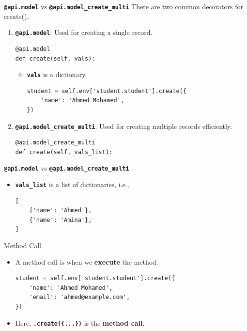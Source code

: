 \begin{frame}[fragile]{\textbf{\texttt{@api.model}} vs \textbf{\texttt{@api.model\_create\_multi}}}
 There are two common decorators for create().
	\begin{enumerate}
		\item \textbf{\texttt{@api.model}}: Used for creating a single record.
		\begin{lstlisting}
@api.model
def create(self, vals):
\end{lstlisting}
		\begin{itemize}
			\item \textbf{\texttt{vals}} is a dictionary.
			\begin{lstlisting}
student = self.env['student.student'].create({
	'name': 'Ahmed Mohamed',
})
\end{lstlisting}
		\end{itemize}
	\item \textbf{\texttt{@api.model\_create\_multi}}: Used for creating multiple records efficiently.
	\begin{lstlisting}
@api.model_create_multi
def create(self, vals_list):
\end{lstlisting}
	\end{enumerate}
\end{frame}

\begin{frame}[fragile]{\textbf{\texttt{@api.model}} vs \textbf{\texttt{@api.model\_create\_multi}}}
	\begin{itemize}
		\item \textbf{\texttt{vals\_list}} is a list of dictionaries, i.e.,
		\begin{lstlisting}
[
	{'name': 'Ahmed'},
	{'name': 'Amina'},
]
\end{lstlisting}
	\end{itemize}
\begin{block}{Method Call}
	\begin{itemize}
		\item A method call is when we \textbf{execute} the method.
		\begin{lstlisting}
student = self.env['student.student'].create({
	'name': 'Ahmed Mohamed',
	'email': 'ahmed@example.com',
})
\end{lstlisting}
		\item Here, \textbf{\texttt{.create(\{...\})}} is the \textbf{method call}.
	\end{itemize}
\end{block}
\end{frame}

